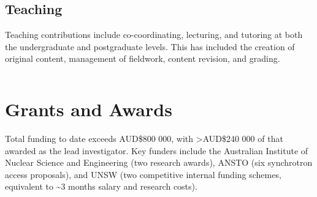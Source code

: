 \documentclass[11pt,a4paper,]{moderncv}
\begin{document}
\hypertarget{teaching}{%
\subsection{Teaching}\label{teaching}}

Teaching contributions include co-coordinating, lecturing, and tutoring
at both the undergraduate and postgraduate levels. This has included the
creation of original content, management of fieldwork, content revision,
and grading. \(~\)

\(~\)

\nopagebreak

\hypertarget{grants-and-awards}{%
\section{Grants and Awards}\label{grants-and-awards}}

Total funding to date exceeds AUD\$800 000, with \textgreater AUD\$240
000 of that awarded as the lead investigator. Key funders include the
Australian Institute of Nuclear Science and Engineering (two research
awards), ANSTO (six synchrotron access proposals), and UNSW (two
competitive internal funding schemes, equivalent to \textasciitilde3
months salary and research costs). \(~\)

\(~\)
\end{document}
